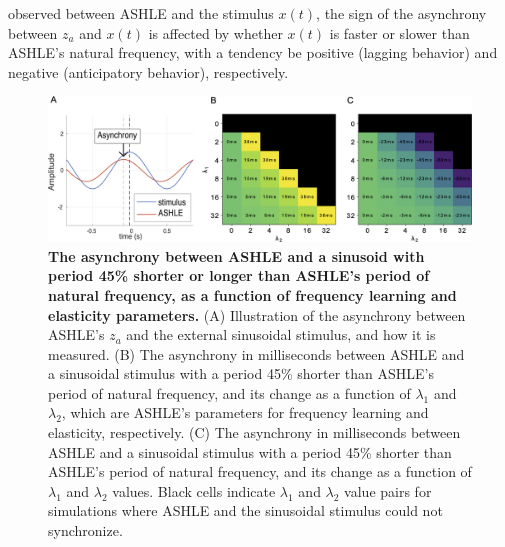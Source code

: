 \documentclass{report}
\begin{document}
observed between ASHLE and the stimulus $x(t)$, the sign of the asynchrony between $z_a$ and $x(t)$ is affected by whether $x(t)$ is faster or slower than ASHLE's natural frequency, with a tendency be positive (lagging behavior) and negative (anticipatory behavior), respectively.

\begin{figure}
    \centering
    \includegraphics[width=1.0\textwidth]{figures/fig3_6.png}
    \caption[The asynchrony between ASHLE and a sinusoid with period 45\% shorter or longer than ASHLE's periof of natural frequency, as a function of frequency learning and elasticity parameters]{\textbf{The asynchrony between ASHLE and a sinusoid with period 45\% shorter or longer than ASHLE's period of natural frequency, as a function of frequency learning and elasticity parameters.} (A) Illustration of the asynchrony between ASHLE's $z_a$ and the external sinusoidal stimulus, and how it is measured. (B) The asynchrony in milliseconds between ASHLE and a sinusoidal stimulus with a period 45\% shorter than ASHLE's period of natural frequency, and its change as a function of $\lambda_1$ and $\lambda_2$, which are ASHLE's parameters for frequency learning and elasticity, respectively. (C) The asynchrony in milliseconds between ASHLE and a sinusoidal stimulus with a period 45\% shorter than ASHLE's period of natural frequency, and its change as a function of $\lambda_1$ and $\lambda_2$ values. Black cells indicate $\lambda_1$ and $\lambda_2$ value pairs for simulations where ASHLE and the sinusoidal stimulus could not synchronize.}
    \label{f3_6}
\end{figure}
\end{document}
